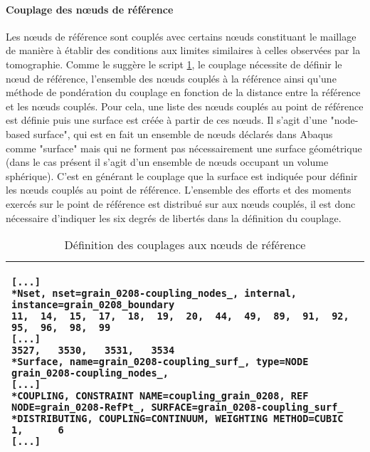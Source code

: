 \paragraph{Couplage des n\oe{}uds de référence\\}
Les n\oe{}uds de référence sont couplés avec certains n\oe{}uds constituant le maillage de manière à établir des conditions aux limites similaires à celles observées par la tomographie. Comme le suggère le script \ref{script05:couplage}, le couplage nécessite de définir le n\oe{}ud de référence, l'ensemble des n\oe{}uds couplés à la référence ainsi qu'une méthode de pondération du couplage en fonction de la distance entre la référence et les n\oe{}uds couplés. Pour cela, une liste des n\oe{}uds couplés au point de référence est définie puis une surface est créée à partir de ces n\oe{}uds. Il s'agit d'une "node-based surface", qui est en fait un ensemble de n\oe{}uds déclarés dans Abaqus comme "surface" mais qui ne forment pas nécessairement une surface géométrique (dans le cas présent il s'agit d'un ensemble de n\oe{}uds occupant un volume sphérique). C'est en générant le couplage que la surface est indiquée pour définir les n\oe{}uds couplés au point de référence. L'ensemble des efforts et des moments exercés sur le point de référence est distribué sur aux n\oe{}uds couplés, il est donc nécessaire d'indiquer les six degrés de libertés dans la définition du couplage.
\begin{table}[h]\centering
	\begin{tabular}{p{}}
		\hline
		\begin{lstlisting}[language={}, breaklines=true]
[...]
*Nset, nset=grain_0208-coupling_nodes_, internal, instance=grain_0208_boundary
11,  14,  15,  17,  18,  19,  20,  44,  49,  89,  91,  92,  95,  96,  98,  99
[...]
3527,   3530,   3531,   3534
*Surface, name=grain_0208-coupling_surf_, type=NODE
grain_0208-coupling_nodes_,
[...]
*COUPLING, CONSTRAINT NAME=coupling_grain_0208, REF NODE=grain_0208-RefPt_, SURFACE=grain_0208-coupling_surf_
*DISTRIBUTING, COUPLING=CONTINUUM, WEIGHTING METHOD=CUBIC
1,      6
[...]
		\end{lstlisting}\\
		\hline
	\end{tabular}
	\caption{\label{script05:couplage}Définition des couplages aux n\oe{}uds de référence}
\end{table}

